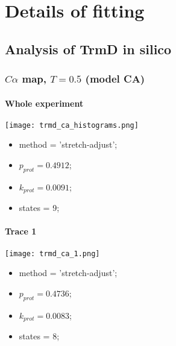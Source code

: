 \chapter{Details of fitting}
\label{app:fit-details}

\section{Analysis of TrmD in silico}
\label{app:fit-details-trmd-theory}

\subsection{$C\alpha$ map, $T=0.5$ (model CA)}
\subsubsection{Whole experiment}
\begin{minipage}[c]{0.7\textwidth}
    \texttt{[image: trmd\_ca\_histograms.png]}
\end{minipage}
\hfill
\begin{minipage}[c]{0.45\textwidth}
    \begin{itemize}
        \item method = 'stretch-adjust';
        \item $p_{prot}=0.4912$;
        \item $k_{prot}=0.0091$;
        \item states = 9;
    \end{itemize}
\end{minipage}

\subsubsection{Trace 1}
\begin{minipage}[c]{0.7\textwidth}
    \texttt{[image: trmd\_ca\_1.png]}
\end{minipage}
\hfill
\begin{minipage}[c]{0.45\textwidth}
    \begin{itemize}
        \item method = 'stretch-adjust';
        \item $p_{prot}=0.4736$;
        \item $k_{prot}=0.0083$;
        \item states = 8;
    \end{itemize}
\end{minipage}

